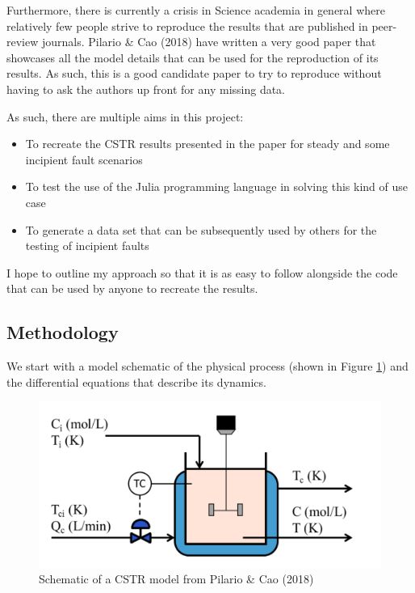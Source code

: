 \documentclass{article}
\begin{document}
Furthermore, there is currently a crisis in Science academia in general where relatively few people strive to reproduce the results that are published in peer-review journals. Pilario \& Cao (2018) have written a very good paper that showcases all the model details that can be used for the reproduction of its results. As such, this is a good candidate paper to try to reproduce without having to ask the authors up front for any missing data. 



As such, there are multiple aims in this project:


\begin{itemize}
	\item To recreate the CSTR results presented in the paper for steady and some incipient fault scenarios
	\item To test the use of the Julia programming language in solving this kind of use case
	\item To generate a data set that can be subsequently used by others for the testing of incipient faults
\end{itemize}

I hope to outline my approach so that it is as easy to follow alongside the code that can be used by anyone to recreate the results. 

\subsection{Methodology}

We start with a model schematic of the physical process (shown in Figure \ref{fig1}) and the differential equations that describe its dynamics. 
 
\begin{figure}[h]	\centering
\includegraphics[width=\textwidth]{img/CSTR_schematic.png}
\caption{Schematic of a CSTR model from Pilario \& Cao (2018)}
\label{fig1}
\end{figure}
\end{document}

